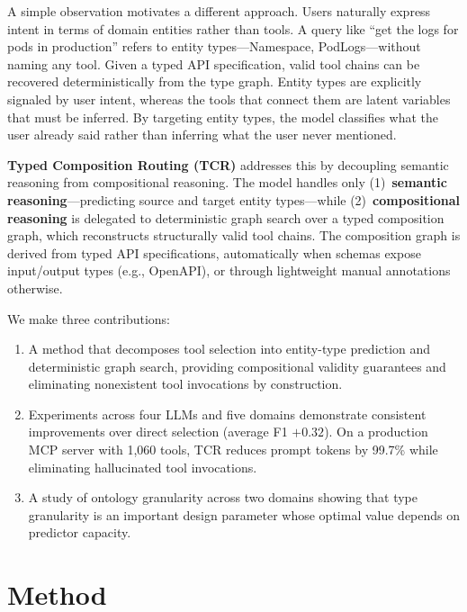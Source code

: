 \documentclass{article}
\begin{document}
A simple observation motivates a different approach. Users naturally express intent in terms of domain entities rather than tools. A query like ``get the logs for pods in production'' refers to entity types---Namespace, PodLogs---without naming any tool. Given a typed API specification, valid tool chains can be recovered deterministically from the type graph. Entity types are explicitly signaled by user intent, whereas the tools that connect them are latent variables that must be inferred. By targeting entity types, the model classifies what the user already said rather than inferring what the user never mentioned.

\textbf{Typed Composition Routing (TCR)} addresses this by decoupling semantic reasoning from compositional reasoning. The model handles only (1)~\textbf{semantic reasoning}---predicting source and target entity types---while (2)~\textbf{compositional reasoning} is delegated to deterministic graph search over a typed composition graph, which reconstructs structurally valid tool chains. The composition graph is derived from typed API specifications, automatically when schemas expose input/output types (e.g., OpenAPI), or through lightweight manual annotations otherwise.

We make three contributions:
\begin{enumerate}
  \item A method that decomposes tool selection into entity-type prediction and deterministic graph search, providing compositional validity guarantees and eliminating nonexistent tool invocations by construction.
  \item Experiments across four LLMs and five domains demonstrate consistent improvements over direct selection (average F1 $+0.32$). On a production MCP server with 1,060 tools, TCR reduces prompt tokens by 99.7\% while eliminating hallucinated tool invocations.
  \item A study of ontology granularity across two domains showing that type granularity is an important design parameter whose optimal value depends on predictor capacity.
\end{enumerate}


\section{Method}
\end{document}
